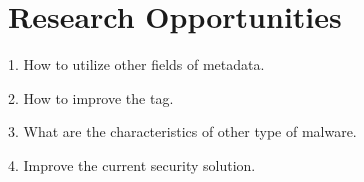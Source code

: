 \section{Research Opportunities}
\label{sec:oppo}

1. How to utilize other fields of metadata. 

2. How to improve the tag. 

3. What are the characteristics of other type of malware. 

4. Improve the current security solution. 